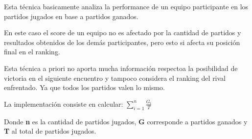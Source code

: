 Esta técnica basicamente analiza la performance de un equipo participante en los partidos jugados en base a partidos ganados. 	

En este caso el score de un equipo no es afectado por la cantidad de partidos y resultados obtenidos de los demás participantes, pero esto si afecta su posición final en el ranking. 

Esta técnica a priori no aporta mucha informaci\'on respectoa la posibilidad de victoria en el siguiente encuentro y tampoco considera el ranking del rival enfrentado.
Ya que todos los partidos valen lo mismo. 

La implementación consiste en calcular: $\sum_{i=1}^n{} \frac{G_i}{T}$ 

Donde \textbf{n} es la cantidad de partidos jugados, \textbf{G} corresponde a partidos ganados y \textbf{T} al total de partidos jugados. \\
